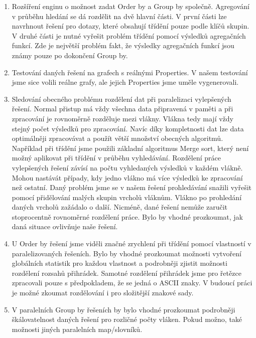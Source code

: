 \begin{enumerate}

\item Rozšíření enginu o možnost zadat Order by a Group by společně.
Agregování v průběhu hledání se dá rozdělit na dvě hlavní části.
V první části lze navrhnout řešení pro dotazy, které obsahují třídění pouze podle klíčů skupin.
V druhé části je nutné vyřešit problém třídění pomocí výsledků agregačních funkcí.
Zde je největší problém fakt, že výsledky agregačních funkcí jsou známy pouze po dokončení Group by.

\item Testování daných řešení na grafech s reálnými Properties.
V našem testování jsme sice volili reálne grafy, ale jejich Properties jsme uměle vygenerovali.

\item Sledování obecného problému rozdělení dat při paralelizaci vylepšených řešení. 
Normal přistup má vždy všechna data připravená v paměti a při zpracování je rovnoměrně rozděluje mezi vlákny.
Vlákna tedy mají vždy stejný počet výsledků pro zpracování.
Navíc díky kompletnosti dat lze data optimálněji zpracovávat a použít větší množství obecných algoritmů.
Například při třídění jsme použili základní algoritmus Merge sort, který není možný aplikovat při třídění v průběhu vyhledávání.  
Rozdělení práce vylepšených řešení závísí na počtu vyhledaných výsledků v každém vlákně.
Mohou nastávát případy, kdy jedno vlákno má více výsledků ke zpracování než ostatní. 
Daný problém jsme se v našem řešení prohledávání snažili vyřešit pomocí přidělování malých skupin vrcholů vláknům.
Vlákno po prohledání daných vrcholů zažádalo o další.
Nicméně, dané řešení nemůže zaručit stoprocentně rovnoměrné rozdělení práce.
Bylo by vhodné prozkoumat, jak daná situace ovlivňuje naše řešení.

\item U Order by řešení jsme viděli značné zrychlení při třídění pomocí vlastností v paralelizovaných řešeních.
Bylo by vhodné prozkoumat možnosti vytvoření globálních statistik pro každou vlastnost a podrobněji zjistit možnosti rozdělení rozsahů přihrádek.
Samotné rozdělení přihrádek jsme pro řetězce zpracovali pouze s předpokladem, že se jedná o ASCII znaky.
V budoucí práci je možné zkoumat rozdělování i pro složitější znakové sady.

\item V paralelních Group by řešeních by bylo vhodné prozkoumat podrobněji škálovatelnost daných řešení pro rozličné počty vláken.
Pokud možno, také možnosti jiných paralelních map/slovníků.
 
\end{enumerate}
